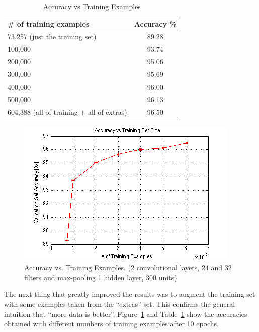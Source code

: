 \documentclass{article} %
\begin{document}
\begin{center}
	\begin{table}[!h]
		  \begin{tabular}{ | l || c ||}
		    \hline
		    \# of training examples & Accuracy \% \\ \hline \hline
		    73,257 (just the training set) & 89.28 \\ \hline
		    100,000 & 93.74 \\ \hline
		    200,000 & 95.06 \\ \hline
		    300,000 & 95.69 \\ \hline
		    400,000 & 96.00 \\ \hline
		    500,000 & 96.13 \\ \hline
		    604,388 (all of training + all of extras) & 96.50 \\ \hline
		  \end{tabular}
	  \caption{Accuracy vs Training Examples}
	  \label{table:train}
	\end{table}
\end{center}

\begin{center}
\begin{figure}[!htb]
  \includegraphics[width=0.8\linewidth]{images/image05}
  \caption{Accuracy vs. Training Examples. (2 convolutional layers, 24 and 32 filters and max-pooling 1 hidden layer, 300 units)}
  \label{fig:accuracy}
\end{figure}
\end{center}


The next thing that greatly improved the results was to augment the training set with some examples taken from the “extras” set. This confirms the general intuition that “more data is better”.  Figure~\ref{fig:accuracy} and Table~\ref{table:train} show the accuracies obtained with different numbers of training examples after 10 epochs.
\end{document}
